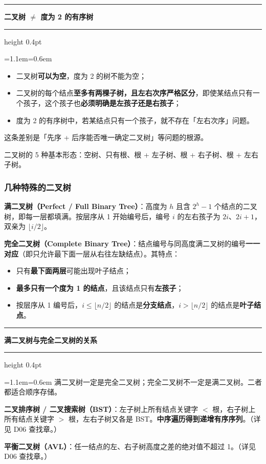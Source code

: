 \documentclass[11pt,openany,UTF8]{ctexbook}
\newcommand{\callouthead}[2]{%
  \par\addvspace{7pt}\noindent
  {\color{#1}\rule[-0.15em]{3pt}{1.05em}}\hspace{0.5em}%
  {\bfseries\color{#1}#2}\par\nobreak\vspace{-0.35em}%
  {\color{rulesep}\hrule height 0.4pt}\nobreak\vspace{0.45em}%
  \begingroup\small\setlength{\parindent}{0pt}%
  \leftskip=1.1em\rightskip=0.6em\noindent\ignorespaces}
\newcommand{\calloutend}{\par\endgroup\addvspace{7pt}}
\newenvironment{callkey}[1]{\callouthead{keybar}{#1}}{\calloutend}
\newenvironment{callwarn}[1]{\callouthead{warnbar}{#1}}{\calloutend}
\begin{document}
\begin{callwarn}{二叉树 $\neq$ 度为 2 的有序树}
\begin{itemize}
\item 二叉树\textbf{可以为空}，度为 2 的树不能为空；
\item 二叉树的每个结点\textbf{至多有两棵子树，且左右次序严格区分}，即使某结点只有一个孩子，这个孩子也\textbf{必须明确是左孩子还是右孩子}；
\item 度为 2 的有序树中，若某结点只有一个孩子，就不存在「左右次序」问题。
\end{itemize}
这条差别是「先序 + 后序能否唯一确定二叉树」等问题的根源。

\end{callwarn}

二叉树的 5 种基本形态：空树、只有根、根 + 左子树、根 + 右子树、根 + 左右子树。

\subsubsection{几种特殊的二叉树}

\textbf{满二叉树（Perfect / Full Binary Tree）}：高度为 $h$ 且含 $2^h-1$ 个结点的二叉树，即每一层都填满。按层序从 1 开始编号后，编号 $i$ 的左右孩子为 $2i$、$2i+1$，双亲为 $\lfloor i/2\rfloor$。

\textbf{完全二叉树（Complete Binary Tree）}：结点编号与同高度满二叉树的编号\textbf{一一对应}（即只允许最下面一层从右往左缺结点）。其特点：

\begin{itemize}
\item 只有\textbf{最下面两层}可能出现叶子结点；
\item \textbf{最多只有一个度为 1 的结点}，且该结点只有\textbf{左孩子}；
\item 按层序从 1 编号后，$i\le\lfloor n/2\rfloor$ 的结点是\textbf{分支结点}，$i>\lfloor n/2\rfloor$ 的结点是\textbf{叶子结点}。
\end{itemize}
\begin{callkey}{满二叉树与完全二叉树的关系}
满二叉树一定是完全二叉树；完全二叉树不一定是满二叉树。二者都适合顺序存储。

\end{callkey}

\textbf{二叉排序树 / 二叉搜索树（BST）}：左子树上所有结点关键字 $<$ 根，右子树上所有结点关键字 $>$ 根，左右子树又各是 BST。\textbf{中序遍历得到递增有序序列}。（详见 D06 查找章。）

\textbf{平衡二叉树（AVL）}：任一结点的左、右子树高度之差的绝对值不超过 1。（详见 D06 查找章。）
\end{document}
